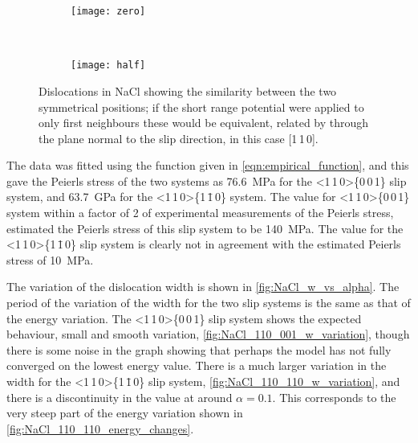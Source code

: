 \begin{figure}
\end{figure}



\begin{figure}
\centering
\begin{subfigure}{55mm}
\centering
\texttt{[image: zero]}
\caption{}
\end{subfigure}
~
\begin{subfigure}{55mm}
\centering
\texttt{[image: half]}
\caption{}
\end{subfigure}


\caption[The symmetrical positions of dislocations in NaCl]{Dislocations in NaCl showing the similarity between the two symmetrical positions; if the short range potential were applied to only first neighbours these would be equivalent, related by through the plane normal to the slip direction, in this case [1\,1\,0]. \label{fig:NaCl_symmetry}}
\end{figure}


The data was fitted using the function given in \autoref{eqn:empirical_function}, and this gave the Peierls stress of the two systems as \SI{76.6}{\mega\pascal} for the <1\,1\,0>\{0\,0\,1\} slip system, and \SI{63.7}{\giga\pascal} for the <1\,1\,0>\{1\,\={1}\,0\} system. The value for <1\,1\,0>\{0\,0\,1\} system within a factor of 2 of experimental measurements of the Peierls stress, \citet{Haasen1985} estimated the Peierls stress of this slip system to be \SI{140}{\mega\pascal}. The value for the <1\,1\,0>\{1\,\={1}\,0\} slip system is clearly not in agreement with the estimated Peierls stress of \SI{10}{\mega\pascal}.



The variation of the dislocation width is shown in \autoref{fig:NaCl_w_vs_alpha}. The period of the variation of the width for the two slip systems is the same as that of the energy variation. The <1\,1\,0>\{0\,0\,1\} slip system shows the expected behaviour, small and smooth variation, \autoref{fig:NaCl_110_001_w_variation}, though there is some noise in the graph showing that perhaps the model has not fully converged on the lowest energy value. There is a much larger variation in the width for the <1\,1\,0>\{1\,\={1}\,0\} slip system, \ref{fig:NaCl_110_110_w_variation}, and there is a discontinuity in the value at around $\alpha=0.1$. This corresponds to the very steep part of the energy variation shown in \autoref{fig:NaCl_110_110_energy_changes}.


